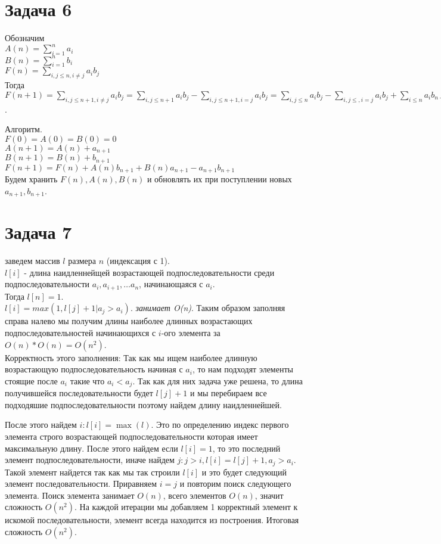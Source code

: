 \documentclass[12pt]{exam}
\begin{document}
\section*{Задача 6}
Обозначим \\
$A(n) = \sum_{i=1}^{n} a_i$\\
$B(n) = \sum_{i=1}^{n} b_i$\\
$F(n) = \sum_{i, j \leq n, i \neq j} a_i b_j$\\
Тогда \\
$F(n + 1) = \sum_{i, j \leq n + 1, i \neq j} a_i b_j = \sum_{i, j \leq n + 1} a_i b_j - \sum_{i, j \leq n + 1, i = j} a_i b_j = 
\sum_{i, j \leq n} a_i b_j - \sum_{i, j \leq, i = j} a_i b_j + \sum_{i \leq n} a_i b_{n+1} + \sum_{j \leq n} a_{n+1} b_j - a_{n+1}b_{n+1} =
F(n) + A(n)b_{n+1} + B(n)a_{n+1} - a_{n+1}b_{n+1}$.

Алгоритм.\\
$F(0) = A(0) = B(0) = 0$\\
$A(n + 1) = A(n) + a_{n + 1}$\\
$B(n + 1) = B(n) + b_{n + 1}$\\
$F(n + 1) = F(n) + A(n)b_{n+1} + B(n)a_{n+1} - a_{n+1}b_{n+1}$\\
Будем хранить $F(n), A(n), B(n)$ и обновлять их при поступлении новых $a_{n+1}, b_{n+1}$.

\section*{Задача 7}
заведем массив $l$ размера $n$ (индексация с 1). \\
$l[i]$ - длина наидленнейщей возрастающей подпоследовательности среди подпоследовательности
$a_i, a_{i + 1}, \ldots a_{n}$, начинающаяся с $a_i$.\\
Тогда $l[n] = 1$.\\
$l[i] = max(1, l[j] + 1 | a_j > a_i)$. \emph{занимает O(n)}.
Таким образом заполняя справа налево мы получим длины наиболее длинных возрастающих подпоследовательностей начинающихся с $i$-ого элемента за $O(n) * O(n) = O(n^2)$.\\
Корректность этого заполнения: 
Так как мы ищем наиболее длинную возрастающую подпоследовательность начиная с $a_i$, 
то нам подходят элементы стоящие после $a_i$ такие что $a_i < a_j$. 
Так как для них задача уже решена, то длина получившейся последовательности будет $l[j] + 1$ и мы перебираем все подходяшие подпоследовательности поэтому найдем длину наидленнейшей.

После этого найдем $i: l[i] = \max(l)$. 
Это по определению индекс первого элемента строго возрастающей подпоследовательности которая имеет максимальную длину.
После этого найдем если $l[i] = 1$, то это последний элемент подпоследовательности,
иначе найдем $j: j > i, l[i] = l[j] + 1, a_j > a_i$. Такой элемент найдется так как мы так строили $l[i]$ и это будет следующий элемент последовательности.
Приравняем $i = j$ и повторим поиск следующего элемента. Поиск элемента занимает $O(n)$, всего элементов $O(n)$, 
значит сложность $O(n^2)$. 
На каждой итерации мы добавляем 1 корректный элемент к искомой последовательности, элемент всегда находится из построения.
Итоговая сложность $O(n^2)$.

 
\end{document}
